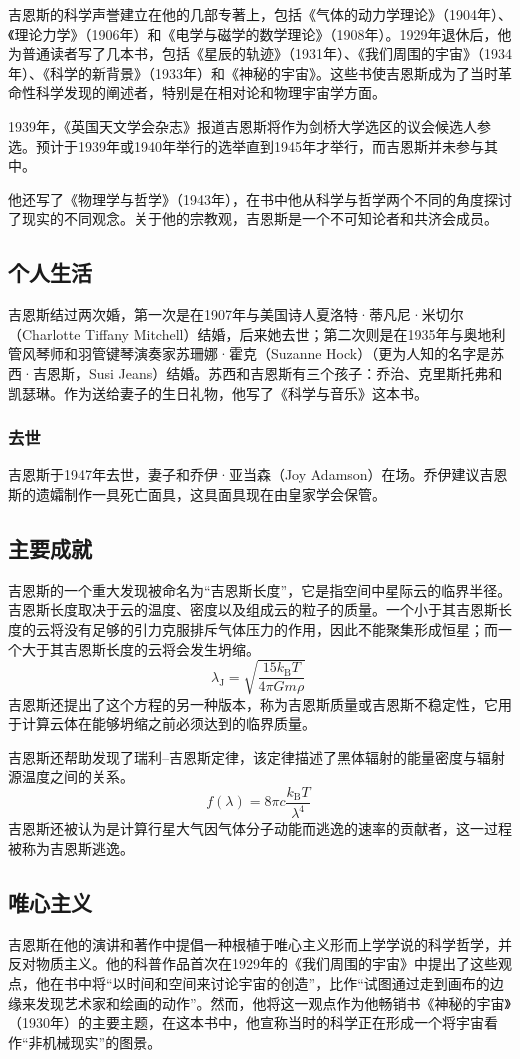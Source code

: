 吉恩斯的科学声誉建立在他的几部专著上，包括《气体的动力学理论》（1904年）、《理论力学》（1906年）和《电学与磁学的数学理论》（1908年）。1929年退休后，他为普通读者写了几本书，包括《星辰的轨迹》（1931年）、《我们周围的宇宙》（1934年）、《科学的新背景》（1933年）和《神秘的宇宙》。这些书使吉恩斯成为了当时革命性科学发现的阐述者，特别是在相对论和物理宇宙学方面。

1939年，《英国天文学会杂志》报道吉恩斯将作为剑桥大学选区的议会候选人参选。预计于1939年或1940年举行的选举直到1945年才举行，而吉恩斯并未参与其中。

他还写了《物理学与哲学》（1943年），在书中他从科学与哲学两个不同的角度探讨了现实的不同观念。关于他的宗教观，吉恩斯是一个不可知论者和共济会成员。
\subsection{个人生活}  
吉恩斯结过两次婚，第一次是在1907年与美国诗人夏洛特·蒂凡尼·米切尔（Charlotte Tiffany Mitchell）结婚，后来她去世；第二次则是在1935年与奥地利管风琴师和羽管键琴演奏家苏珊娜·霍克（Suzanne Hock）（更为人知的名字是苏西·吉恩斯，Susi Jeans）结婚。苏西和吉恩斯有三个孩子：乔治、克里斯托弗和凯瑟琳。作为送给妻子的生日礼物，他写了《科学与音乐》这本书。
\subsubsection{去世}  
吉恩斯于1947年去世，妻子和乔伊·亚当森（Joy Adamson）在场。乔伊建议吉恩斯的遗孀制作一具死亡面具，这具面具现在由皇家学会保管。
\subsection{主要成就}  
吉恩斯的一个重大发现被命名为“吉恩斯长度”，它是指空间中星际云的临界半径。吉恩斯长度取决于云的温度、密度以及组成云的粒子的质量。一个小于其吉恩斯长度的云将没有足够的引力克服排斥气体压力的作用，因此不能聚集形成恒星；而一个大于其吉恩斯长度的云将会发生坍缩。
\[
\lambda_{\text{J}} = \sqrt{\frac{15 k_{\text{B}} T}{4\pi G m \rho}}~
\]
吉恩斯还提出了这个方程的另一种版本，称为吉恩斯质量或吉恩斯不稳定性，它用于计算云体在能够坍缩之前必须达到的临界质量。

吉恩斯还帮助发现了瑞利–吉恩斯定律，该定律描述了黑体辐射的能量密度与辐射源温度之间的关系。
\[
f(\lambda) = 8\pi c \frac{k_{\text{B}} T}{\lambda^4}~
\]
吉恩斯还被认为是计算行星大气因气体分子动能而逃逸的速率的贡献者，这一过程被称为吉恩斯逃逸。
\subsection{唯心主义}  
吉恩斯在他的演讲和著作中提倡一种根植于唯心主义形而上学学说的科学哲学，并反对物质主义。他的科普作品首次在1929年的《我们周围的宇宙》中提出了这些观点，他在书中将“以时间和空间来讨论宇宙的创造”，比作“试图通过走到画布的边缘来发现艺术家和绘画的动作”。然而，他将这一观点作为他畅销书《神秘的宇宙》（1930年）的主要主题，在这本书中，他宣称当时的科学正在形成一个将宇宙看作“非机械现实”的图景。

